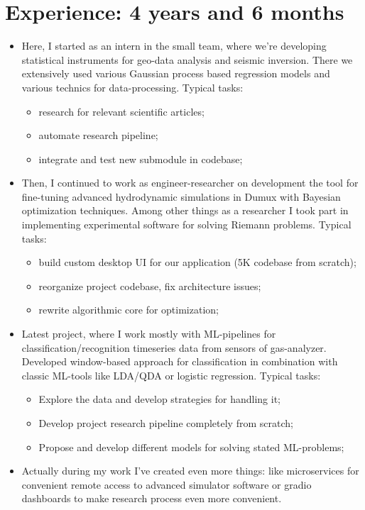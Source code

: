 \documentclass[12pt,a4paper,roman]{moderncv}
\begin{document}
\section{Experience: 4 years and 6 months}
\begin{itemize}
\item Here, I started as an intern in the small team, where we're developing statistical instruments for geo-data analysis and seismic inversion. 
There we extensively used various Gaussian process based regression models and various technics for data-processing. \newline \newline
Typical tasks: 
 \begin{itemize}
  \item research for relevant scientific articles;
  \item automate research pipeline;
  \item integrate and test new submodule in codebase; \newline
 \end{itemize}
\item Then, I continued to work as engineer-researcher on development the tool for fine-tuning advanced 
hydrodynamic simulations in Dumux with Bayesian optimization techniques.  
Among other things as a researcher I took part in implementing experimental software for solving Riemann problems. \newline \newline
Typical tasks: 
 \begin{itemize}
  \item build custom desktop UI for our application (5K codebase from scratch);
  \item reorganize project codebase, fix architecture issues;
  \item rewrite algorithmic core for optimization; \newline
 \end{itemize}
\item Latest project, where I work mostly with ML-pipelines for classification/recognition timeseries data from sensors of gas-analyzer.
Developed window-based approach for classification in combination with classic ML-tools like LDA/QDA or logistic regression. \newline \newline
Typical tasks: 
 \begin{itemize}
  \item Explore the data and develop strategies for handling it;
  \item Develop project research pipeline completely from scratch;
  \item Propose and develop different models for solving stated ML-problems; \newline
 \end{itemize}
\item Actually during my work I've created even more things: like microservices for convenient remote access to advanced simulator software
or gradio dashboards to make research process even more convenient. \newline
\end{itemize}
\end{document}
